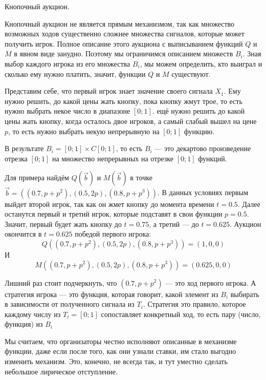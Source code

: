 \begin{myex} Кнопочный аукцион.

Кнопочный аукцион не является прямым механизмом, так как множество возможных ходов существенно сложнее множества сигналов, которые может получить игрок. Полное описание этого аукциона с выписыванием функций $ Q $ и $ M $ в явном виде  занудно. Поэтому мы ограничимся описанием множеств $ B_{i} $. Зная выбор каждого игрока из его множества $ B_{i}$, мы можем определить, кто выиграл и сколько ему нужно платить, значит, функции $ Q $ и $ M $ существуют.

Представим себе, что первый игрок знает значение  своего сигнала $ X_{1} $. Ему нужно решить, до какой цены жать кнопку, пока кнопку жмут трое, то есть нужно выбрать некое число в диапазоне $ [0;1] $. ещё нужно решить до какой цены жать кнопку, когда осталось двое игроков, а самый слабый вышел на цене $ p $, то есть нужно выбрать некую непрерывную на $ [0;1] $ функцию.

В результате $ B_{i}=[0;1]\times C[0;1] $, то есть $ B_{i} $ — это декартово произведение отрезка $ [0;1] $ на множество непрерывных на отрезке $ [0;1] $ функций.

Для примера найдём $ Q(\vec{b})$ и $ M(\vec{b}) $ в точке  $\vec{b}=((0.7,p+p^{2}),(0.5,2p),(0.8,p+p^{3})) $. В данных условиях первым выйдет второй игрок, так как он жмет кнопку до момента времени $ t=0.5 $. Далее останутся первый и третий игрок, которые подставят в свои функции $ p=0.5 $. Значит, первый будет жать кнопку до $ t=0.75 $, а третий — до $ t=0.625 $. Аукцион окончится в $ t=0.625 $ победой первого игрока:
\begin{equation}
Q((0.7,p+p^{2}),(0.5,2p),(0.8,p+p^{3}))=(1,0,0)
\end{equation}
И
\begin{equation}
M((0.7,p+p^{2}),(0.5,2p),(0.8,p+p^{3}))=(0.625,0,0)
\end{equation}

Лишний раз стоит подчеркнуть, что $ (0.7,p+p^{2}) $ — это ход первого игрока. А стратегия игрока — это функция, которая говорит, какой элемент из $ B_{i} $ выбирать в зависимости от полученного сигнала из $ T_{i} $. Стратегия это правило, которое каждому числу из $ T_{i}=[0;1] $ сопоставляет конкретный ход, то есть пару (число, функция) из $ B_{i} $

\end{myex}

Мы считаем, что организаторы честно исполняют описанные в механизме функции, даже если после того, как они узнали ставки, им стало выгодно изменить механизм. Это, конечно, не всегда так, и тут уместно сделать небольшое лирическое отступление.

